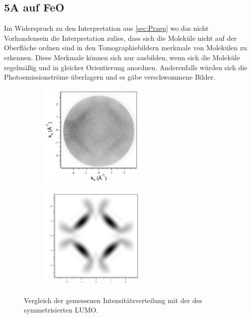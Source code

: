         \subsection{5A auf FeO}
                Im Widerspruch zu den Interpretation aus \autoref{sec:Praep} wo das nicht Vorhandensein die Interpretation zulies, dass sich die Moleküle nicht auf der Oberfläche ordnen sind in den Tomographiebildern merkmale von Molekülen zu erkennen.
                Diese Merkmale können sich nur ausbilden, wenn sich die Moleküle regelmäßig und in gleicher Orientierung anordnen.
                Anderenfalls würden sich die Photoemissionströme überlagern und es gäbe verschwommene Bilder.
                \begin{figure}
                    \centering
                    \begin{subfigure}[t]{0.48\textwidth}
                        \centering
                        \includegraphics[height=5cm]{./content/pictures/FeO+5A/FeO_5A_34_80eV.png}
                    \end{subfigure}
                    \begin{subfigure}[t]{0.48\textwidth}
                        \centering
                        \includegraphics[height=5cm]{./content/pictures/FeO+5A/MO_LUMO_RT_RT.png}
                    \end{subfigure}
                    \caption{Vergleich der gemessenen Intensitätsverteilung mit der des symmetrisierten LUMO.}
                    \label{fig:FeO5A1}
                \end{figure}
